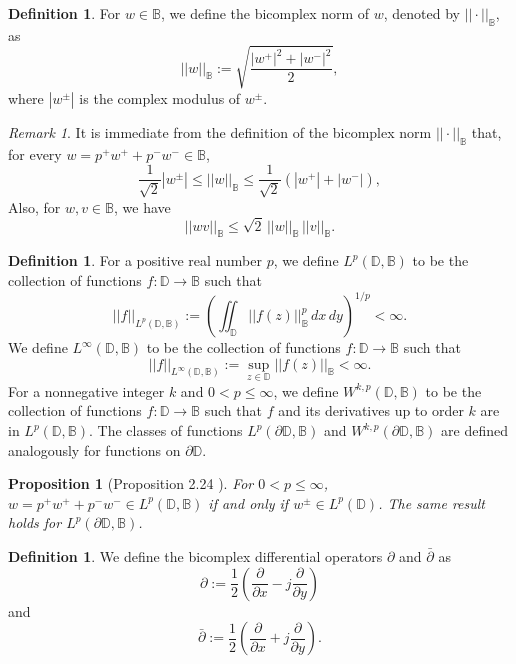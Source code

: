 \documentclass[12pt,reqno]{amsart}
\newtheorem{prop}[theorem]{Proposition}
\theoremstyle{definition}
\newtheorem{deff}[theorem]{Definition}
\theoremstyle{remark}
\newtheorem{comm}[theorem]{Remark}
\newcommand{\p}{\partial}
\newcommand{\dbar}{\bar\partial}
\newcommand{\bc}{\mathbb{B}}
\newcommand{\disk}{\mathbb{D}}
\begin{document}
\begin{deff}
    For $w \in \bc$, we define the bicomplex norm of $w$, denoted by $||\cdot||_{\bc}$,  as
    \[
        ||w||_{\bc} := \sqrt{\frac{|w^+|^2 + |w^-|^2}{2}},
    \]
    where $|w^{\pm}|$ is the complex modulus of $w^\pm$. 
\end{deff}

\begin{comm}
It is immediate from the definition of the bicomplex norm $||\cdot||_{\bc}$ that, for every $w = p^+ w^+ + p^- w^- \in \bc$,   \begin{equation}\label{bcbasicestimates}
        \frac{1}{\sqrt{2}} |w^\pm| \leq ||w||_{\bc} \leq \frac{1}{\sqrt{2}}\left( |w^+| + |w^-|\right), 
    \end{equation}
Also, for $w,v \in \bc$, we have
    \begin{equation}\label{stareqn}
        ||wv||_\bc \leq \sqrt{2} \, ||w||_\bc \, ||v||_\bc.
    \end{equation}
\end{comm}

\begin{deff}
    For a positive real number $p$, we define $L^p(\disk,\bc)$ to be the collection of functions $f: \disk\to\bc$ such that
    \[
        ||f||_{L^p(\disk,\bc)} := \left( \iint_{\disk}||f(z)||^p_\bc\,dx\,dy\right)^{1/p} < \infty.
    \]  
    We define $L^\infty(\disk,\bc)$ to be the collection of functions $f: \disk\to\bc$ such that 
    \[
        ||f||_{L^\infty(\disk,\bc)} := \sup_{z \in \disk} ||f(z)||_{\bc} < \infty.
    \]
    For a nonnegative integer $k$ and $0 < p \leq \infty$, we define $W^{k,p}(\disk,\bc)$ to be the collection of functions $f: \disk\to\bc$ such that $f$ and its derivatives up to order $k$ are in $L^p(\disk,\bc)$. The classes of functions $L^p(\p\disk,\bc)$ and $W^{k,p}(\p\disk,\bc)$ are defined analogously for functions on $\p\disk$. 
\end{deff}

\begin{prop}[Proposition 2.24 \cite{BCAtomic}]\label{prop: pminlpfuncinlp} 
    For $0 < p \leq \infty$, $w = p^+ w^+ + p^- w^- \in L^p(\disk,\bc)$ if and only if $w^\pm \in L^p(\disk)$. The same result holds for $L^p(\p \disk,\bc)$. 
\end{prop}


\begin{deff}\label{bcdbardef}
    We define the bicomplex differential operators $\p$ and $\dbar$ as 
    \[
        \p := \frac{1}{2} \left( \frac{\p}{\p x} - j \frac{\p }{\p y}\right)
    \]
    and
    \[
        \dbar := \frac{1}{2} \left( \frac{\p}{\p x} + j \frac{\p }{\p y}\right).
    \]
\end{deff}
\end{document}
